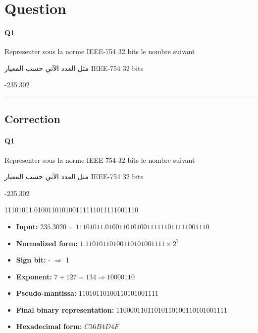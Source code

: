 
\section{Question}


\paragraph{Q1}

Representer sous la norme IEEE-754 32 bits le nombre suivant

\begin{arab}[utf]
مثل العدد الآتي حسب المعيار IEEE-754 32 bits
\end{arab}

-235.302



\hrule width 1\linewidth
\pagebreak

\subsection{Correction}


\paragraph{Q1}

Representer sous la norme IEEE-754 32 bits le nombre suivant

\begin{arab}[utf]
مثل العدد الآتي حسب المعيار IEEE-754 32 bits
\end{arab}

-235.302

\num{ 11101011.010011010100111111011111001110 }

\begin{itemize}
  \item \textbf{Input:} $235.3020 = \num{ 11101011.010011010100111111011111001110 }$
  \item \textbf{Normalized form:} $1.11010110100110101001111 \times 2^7$
  \item \textbf{Sign bit:} - $\Rightarrow$ 1
  \item \textbf{Exponent:} $7 + 127 = 134 \Rightarrow 10000110$
  \item \textbf{Pseudo-mantissa:} $11010110100110101001111$
  \item \textbf{Final binary representation:}  $11000011011010110100110101001111 $
  \item \textbf{Hexadecimal form:} $ C36B4D4F $
  \end{itemize}

